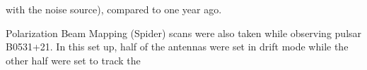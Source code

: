 \documentclass[a4paper,12pt]{article}
\begin{document}
with the noise source), compared to one year ago.

                                                                                                                                                                                                                                                                                                                                                                                                                                                                                                                                                                                                                                                                                                                                                                                                                                                                                                                                                                                                                                                                                                                                                                                                                                                                                                                                                                                                                                                                                                                                                                                                                                                                                                                                                                                                                                                                                                                                                                                                                                                                                                                                                                                                                                                                                                                                                                                                                                                                                                                                                                                                                                                                                                                                                                                                                                                                                                                                                                                                                                                                                                                                             Polarization Beam Mapping (Spider) scans were also taken while observing pulsar B0531+21. In this set up, half of the antennas were set in drift mode while the other half were set to track the 
\end{document}
